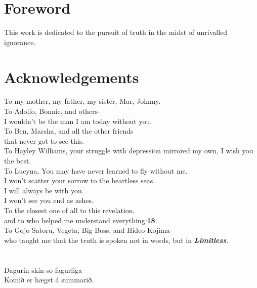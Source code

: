 \documentclass[12pt]{book}
\begin{document}
\chapter*{Foreword}

This work is dedicated to the pursuit of truth in the midst of unrivalled ignorance.

\chapter*{Acknowledgements}
\begin{flushleft}
To my mother, my father, my sister, Mar, Johnny.\\
To Adolfo, Bonnie, and others-\\
I wouldn't be the man I am today without you.\\
To Ben, Marsha, and all the other friends\\
that never got to see this.\\
To Hayley Williams, your struggle with depression mirrored my own, I wish you the best.\\
To Lucyna, You may have never learned to fly without me.\\
I won't scatter your sorrow to the heartless seas.\\
I will always be with you.\\
I won't see you end as ashes.\\
To the closest one of all to this revelation,\\
and to who helped me understand everything:\quad \textbf{18}.\\
To Gojo Satoru, Vegeta, Big Boss, and Hideo Kojima-\\
who taught me that the truth is spoken not in words, but in \textbf{\textit{Limitless}}.
\end{flushleft}

\chapter*{}
\begin{flushright}
Dagurin skín so fagurliga  \\
Komið er hægst á summarið. \\
\end{flushright}

\tableofcontents
\end{document}
